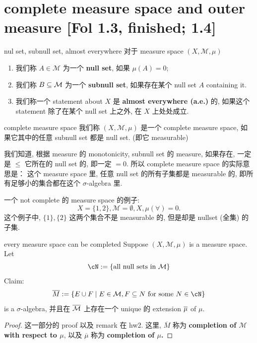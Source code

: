 \documentclass[lang=cn,11pt]{elegantbook}
\begin{document}
\chapter{complete measure space and outer measure [Fol 1.3, finished; 1.4]}

\begin{definition}{nul set, subnull set, almost everywhere}
对于 measure space $(X, \mathcal{M}, \mu)$
\begin{enumerate}
    \item 我们称 $A \in \mathcal{M}$ 为一个 \textbf{null set}, 如果 $\mu(A) = 0$;
    \item 我们称 $B \subseteq \mathcal{M}$ 为一个 \textbf{subnull set}, 如果存在某个 null set $A$ containing it.
    \item 我们称一个 statement about $X$ 是 \textbf{almost everywhere (a.e.)} 的, 如果这个 statement 除了在某个 null set 上之外, 在 $X$ 上处处成立.
\end{enumerate}
\end{definition}


\begin{definition}{complete measure space}
    我们称 $(X,\mathcal{M}, \mu)$ 是一个 complete measure space, 如果它其中的任意 subnull set 都是 null set. (即它 measurable)
\end{definition}
\begin{remark}
    我们知道, 根据 measure 的 monotonicity, subnull set 的 measure, 如果存在, 一定是 $\leq$ 它所在的 null set 的, 即一定 $=0$. 所以 complete measure space 的实际意思是： 这个 measure space 里, 任意 null set 的所有子集都是 measurable 的, 即所有足够小的集合都在这个 $\sigma$-algebra 里.
\end{remark}




\begin{example} 一个 not complete 的 measure space 的例子:
$$
X = \{1,2\}, \mathcal{M} = {\emptyset, X}, \mu(\forall) = 0.
$$
这个例子中, $\{1\}, \{2\}$ 这两个集合不是 measurable 的, 但是却是 nullset (全集) 的子集.
\end{example}



\begin{theorem}{every measure space can be completed}
    Suppose $(X, \mathcal{M},\mu)$ is a measure space.\\
    Let 
    \[
    \cN := \{\text{all null sets in }   \mathcal{M} \}
    \]
    Claim:
    \[
    \ol{M}  := \{   E\cup F \mid E \in \mathcal{M}, F \sub N \text{ for some } N \in \cN \}
    \]
    is a $\sigma$-algebra, 并且在 $\overline{\mathcal{M}}$ 上存在一个 unique 的 extension $\overline{\mu}$ of $\mu$.
\end{theorem}
\begin{proof}
    这一部分的 proof 以及 remark 在 hw2. 这里, $\overline{M}$ 称为 \textbf{completion of $\mathcal{M}$ with respect to $\mu$}, 以及 $\overline{\mu}$ 称为 \textbf{completion of $\mu$.}
\end{proof}
\end{document}
